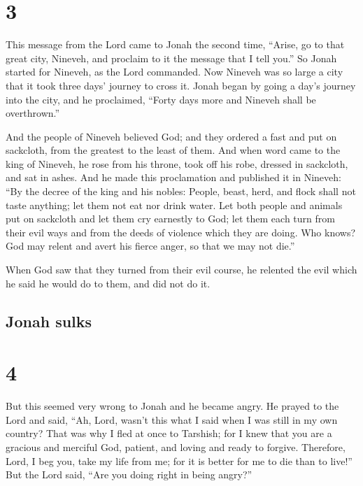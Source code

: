 \hypertarget{section-2}{%
\section{3}\label{section-2}}

 This message from the Lord came to Jonah the second time,
 ``Arise, go to that great city, Nineveh, and proclaim to it
the message that I tell you.''  So Jonah started for
Nineveh, as the Lord commanded. Now Nineveh was so large a city that it
took three days' journey to cross it.  Jonah began by going
a day's journey into the city, and he proclaimed, ``Forty days more and
Nineveh shall be overthrown.''

 And the people of Nineveh believed God; and they ordered a
fast and put on sackcloth, from the greatest to the least of them.
 And when word came to the king of Nineveh, he rose from his
throne, took off his robe, dressed in sackcloth, and sat in ashes.
 And he made this proclamation and published it in Nineveh:
``By the decree of the king and his nobles: People, beast, herd, and
flock shall not taste anything; let them not eat nor drink water.
 Let both people and animals put on sackcloth and let them
cry earnestly to God; let them each turn from their evil ways and from
the deeds of violence which they are doing.  Who knows? God
may relent and avert his fierce anger, so that we may not die.''

 When God saw that they turned from their evil course, he
relented the evil which he said he would do to them, and did not do it.

\hypertarget{jonah-sulks}{%
\subsection{Jonah sulks}\label{jonah-sulks}}

\hypertarget{section-3}{%
\section{4}\label{section-3}}

 But this seemed very wrong to Jonah and he became angry.
 He prayed to the Lord and said, ``Ah, Lord, wasn't this
what I said when I was still in my own country? That was why I fled at
once to Tarshish; for I knew that you are a gracious and merciful God,
patient, and loving and ready to forgive.  Therefore, Lord,
I beg you, take my life from me; for it is better for me to die than to
live!''  But the Lord said, ``Are you doing right in being
angry?''

